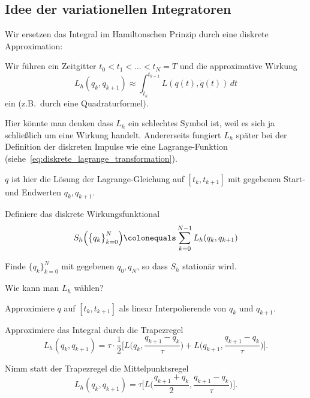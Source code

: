 \subsection{Idee der variationellen Integratoren}

Wir ersetzen das Integral im Hamiltonschen Prinzip durch eine diskrete Approximation:

Wir führen ein Zeitgitter $t_0<t_1<\hdots < t_N = T$ und die approximative Wirkung
\begin{equation*}
	L_h(q_k,q_{k+1})\approx \int_{t_k}^{t_{k+1}} L(q(t),\dot q(t))\,dt
\end{equation*}
ein (z.B.\ durch eine Quadraturformel).

Hier könnte man denken dass $L_h$ ein schlechtes Symbol ist, weil es sich ja schließlich um eine Wirkung handelt. Andererseits fungiert $L_h$ später bei der Definition der diskreten Impulse wie eine Lagrange-Funktion (siehe~\eqref{eq:diskrete_lagrange_transformation}).

$q$ ist hier die Lösung der Lagrange-Gleichung auf $[t_k,t_{k+1}]$ mit gegebenen Start- und Endwerten $q_k,q_{k+1}$.
	
Definiere das diskrete Wirkungsfunktional
\begin{equation*}
	S_h\Big(\big\{q_k\big\}_{k=0}^N\Big) \colonequals \sum_{k=0}^{N-1} L_h(q_k,q_{k+1})
\end{equation*}

\begin{definition}
	Finde $\{q_k\}^N_{k=0}$  mit gegebenen $q_0, q_N$, so dass $S_h$ stationär wird.
\end{definition}

Wie kann man $L_h$ wählen?

\begin{bsp}
	Approximiere $q$ auf $[t_k, t_{k+1}]$ als linear Interpolierende von $q_k$ und $q_{k+1}$.
	
	Approximiere das Integral durch die Trapezregel
	\begin{equation*}
		L_h(q_k, q_{k+1}) =
		\tau \cdot \frac{1}{2} \Big[L\Big(q_k, \frac{q_{k+1} - q_k}{\tau}\Big) +  L\Big(q_{k+1}, \frac{q_{k+1} - q_k}{\tau}\Big)\Big].
	\end{equation*}
\end{bsp}

\begin{bsp}
	Nimm statt der Trapezregel die Mittelpunktsregel
	\begin{equation*}
		L_h(q_k, q_{k+1}) = \tau \Big[L\Big(\frac{q_{k+1} + q_k}{2}, \frac{q_{k+1} - q_k}{\tau}\Big)\Big].
	\end{equation*}
\end{bsp}


